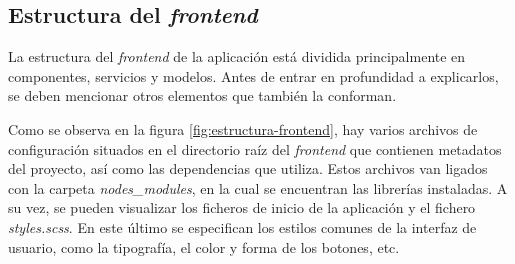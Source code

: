 \documentclass[pdftex,11pt,a4paper]{book}
\begin{document}
\vspace{1cm}

\subsection{Estructura del \textit{frontend}}

La estructura del \textit{frontend} de la aplicación está dividida principalmente en componentes, servicios y modelos. Antes de entrar en profundidad a explicarlos, se deben mencionar otros elementos que también la conforman.

Como se observa en la figura \ref{fig:estructura-frontend}, hay varios archivos de configuración situados en el directorio raíz del \textit{frontend} que contienen metadatos del proyecto, así como las dependencias que utiliza. Estos archivos van ligados con la carpeta \textit{nodes\_modules}, en la cual se encuentran las librerías instaladas. A su vez, se pueden visualizar los ficheros de inicio de la aplicación y el fichero \textit{styles.scss}. En este último se especifican los estilos comunes de la interfaz de usuario, como la tipografía, el color y forma de los botones, etc.
\end{document}
